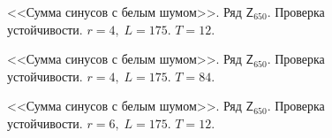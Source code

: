 \documentclass[specialist,
               substylefile = spbu.rtx,
               subf,href,colorlinks=true, 12p]{disser}
\begin{document}
\begin{figure}[h]
	\captionsetup{justification=centering}
	\caption{<<Сумма синусов с белым шумом>>. Ряд $\mathsf{Z}_{650}$. Проверка устойчивости. $r = 4, \; L = 175$. $T = 12$.}
\end{figure}

\begin{figure}[h]
	\captionsetup{justification=centering}
	\caption{<<Сумма синусов с белым шумом>>. Ряд $\mathsf{Z}_{650}$. Проверка устойчивости. $r = 4, \; L = 175$. $T = 84$.}
\end{figure}

\begin{figure}[h]
	\captionsetup{justification=centering}
	\caption{<<Сумма синусов с белым шумом>>. Ряд $\mathsf{Z}_{650}$. Проверка устойчивости. $r = 6, \; L = 175$. $T = 12$.}
	\label{edsiner6.12}
\end{figure}
\end{document}
